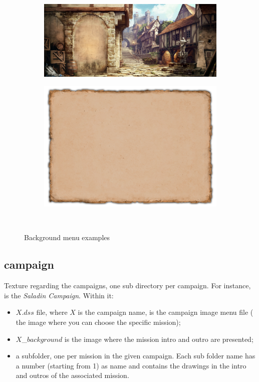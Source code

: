 \begin{appendices}
    \begin{figure}
        \centering
        \begin{subfigure}{0.48\textwidth}
            \centering
            \includegraphics[width=1.0\textwidth]{src/images/mainmenu-bg}
        \end{subfigure}\quad%
        \begin{subfigure}{0.48\textwidth}
            \centering
            \includegraphics[width=1.0\textwidth]{src/images/popup-menu-bg}
        \end{subfigure}\\%
        \caption{Background menu examples}
        \label{fig:backgrounds}
    \end{figure}

    \subsection{campaign}

    Texture regarding the campaigns, one sub directory per campaign. For instance,  is the \textit{Saladin Campaign}. Within it:
    \begin{itemize}
        \item $X.dss$ file, where $X$ is the campaign name, is the campaign image menu file (\ie{} the image where you can choose the specific mission);
        \item $X$\_$background$ is the image where the mission intro and outro are presented;
        \item a subfolder, one per mission in the given campaign. Each sub folder name has a number (starting from 1) as name and contains the drawings in the intro and outros of the associated mission.
    \end{itemize}


\end{appendices}
